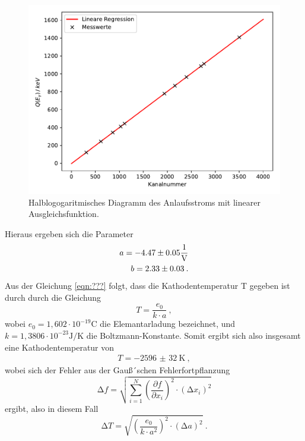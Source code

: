 \begin{figure}[H]
  \centering
  \includegraphics{plot3.pdf}
  \caption{Halblogogaritmisches Diagramm des Anlaufsstroms mit linearer Ausgleichsfunktion.}
  \label{fig:plot3}
\end{figure}
Hieraus ergeben sich die Parameter
\begin{align*}
  a = -4.47 \pm 0.05 \si{\per\volt}\\
  b = 2.33 \pm 0.03 \si \: .\\
\end{align*}
Aus der Gleichung \ref{eqn:???} folgt, dass die Kathodentemperatur T gegeben ist durch
durch die Gleichung
\begin{equation}
  T = \frac{e_0}{k \cdot a} \: ,
\end{equation}
wobei $e_0= 1,602 \cdot 10^{-19} \si{\coulomb} $ \cite{q1} die Elemantarladung bezeichnet,
und $k=1,3806 \cdot 10^{-23} \si{\joule\per\kelvin} $\cite{q2} die Boltzmann-Konstante.
Somit ergibt sich also insgesamt eine Kathodentemperatur von
\begin{align*}
  T= \SI{-2596(32)}{\kelvin} \: ,
\end{align*}
wobei sich der Fehler aus der Gauß´schen Fehlerfortpflanzung
\begin{equation}
  \increment f = \sqrt{ \sum_{i=1}^N \left( \frac{\partial f}{\partial x_i}\right)^2
  \cdot (\increment x_i)^2  }
  \label{eqn:gaus}
\end{equation}
ergibt, also in diesem Fall
\begin{equation}
  \increment T = \sqrt{(\frac{e_0}{k \cdot a^2})^2 \cdot (\increment a)^2} \: .
\end{equation}
